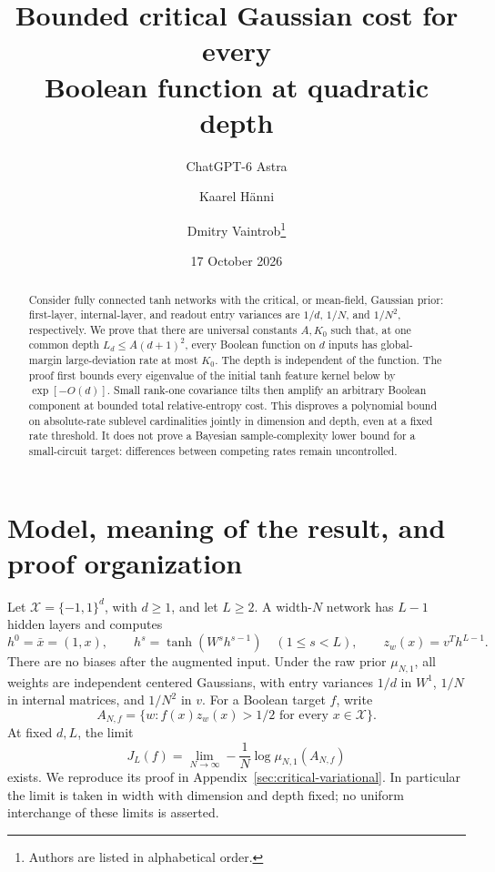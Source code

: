 \documentclass[11pt]{article}
\title{Bounded critical Gaussian cost for every\\Boolean function at quadratic depth}
\author{ChatGPT-6 Astra \and Kaarel H\"anni \and Dmitry Vaintrob\thanks{Authors are listed in alphabetical order.}}
\date{17 October 2026}
\begin{document}
\maketitle
\begin{abstract}
Consider fully connected tanh networks with the critical, or mean-field,
Gaussian prior: first-layer, internal-layer, and readout entry variances
are $1/d$, $1/N$, and $1/N^2$, respectively. We prove that there are
universal constants $A,K_0$ such that, at one common depth
$L_d\le A(d+1)^2$, every Boolean function on $d$ inputs has global-margin
large-deviation rate at most $K_0$. The depth is independent of the function.
The proof first bounds every eigenvalue of the initial tanh feature kernel
below by $\exp[-O(d)]$. Small rank-one covariance tilts then amplify an
arbitrary Boolean component at bounded total relative-entropy cost.
This disproves a polynomial bound on absolute-rate sublevel cardinalities
jointly in dimension and depth, even at a fixed rate threshold. It does
not prove a Bayesian sample-complexity lower bound for a small-circuit
target: differences between competing rates remain uncontrolled.
\end{abstract}

\section{Model, meaning of the result, and proof organization}

Let $\mathcal X=\{-1,1\}^d$, with $d\ge1$, and let $L\ge2$.
A width-$N$ network has $L-1$ hidden layers and computes
\[
 h^0=\bar x=(1,x),\qquad h^s=\tanh(W^s h^{s-1})\quad(1\le s<L),
 \qquad z_w(x)=v^T h^{L-1}.
\]
There are no biases after the augmented input. Under the raw prior
$\mu_{N,1}$, all weights are independent centered Gaussians, with entry
variances $1/d$ in $W^1$, $1/N$ in internal matrices, and $1/N^2$ in $v$.
For a Boolean target $f$, write
\[
 A_{N,f}=\{w:f(x)z_w(x)>1/2\text{ for every }x\in\mathcal X\}.
\]
At fixed $d,L$, the limit
\[
 J_L(f)=\lim_{N\to\infty}-\frac1N\log\mu_{N,1}(A_{N,f})
\]
exists. We reproduce its proof in Appendix~\ref{sec:critical-variational}.
In particular the limit is taken in width with dimension and depth fixed;
no uniform interchange of these limits is asserted.
\end{document}
